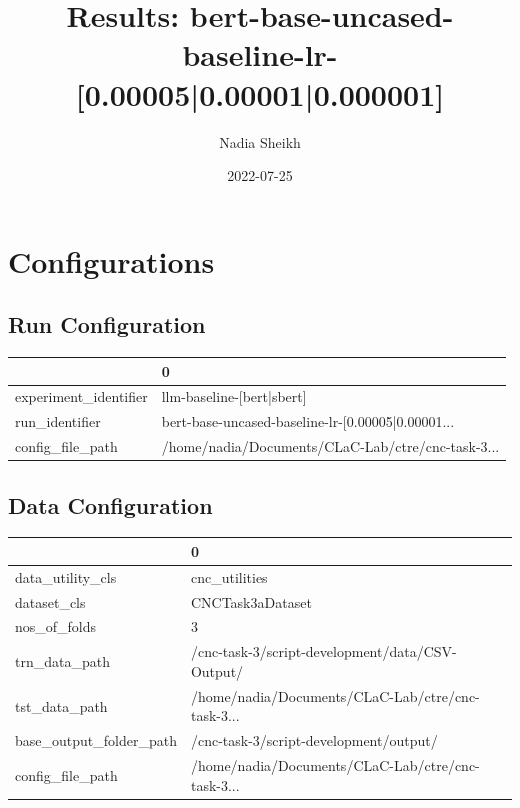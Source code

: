 \documentclass{article}
\title{Results: bert-base-uncased-baseline-lr-[0.00005|0.00001|0.000001]}
\author{Nadia Sheikh}
\date{2022-07-25}
\begin{document}
\maketitle
\section{Configurations}
\subsection{Run Configuration}
\begin{tabular}{ll}
\toprule
{} &                                                  0 \\
\midrule
experiment\_identifier &                          llm-baseline-[bert|sbert] \\
run\_identifier        &  bert-base-uncased-baseline-lr-[0.00005|0.00001... \\
config\_file\_path      &  /home/nadia/Documents/CLaC-Lab/ctre/cnc-task-3... \\
\bottomrule
\end{tabular}

\subsection{Data Configuration}
\begin{tabular}{ll}
\toprule
{} &                                                  0 \\
\midrule
data\_utility\_cls        &                                      cnc\_utilities \\
dataset\_cls             &                                   CNCTask3aDataset \\
nos\_of\_folds            &                                                  3 \\
trn\_data\_path           &    /cnc-task-3/script-development/data/CSV-Output/ \\
tst\_data\_path           &  /home/nadia/Documents/CLaC-Lab/ctre/cnc-task-3... \\
base\_output\_folder\_path &             /cnc-task-3/script-development/output/ \\
config\_file\_path        &  /home/nadia/Documents/CLaC-Lab/ctre/cnc-task-3... \\
\bottomrule
\end{tabular}
\end{document}
